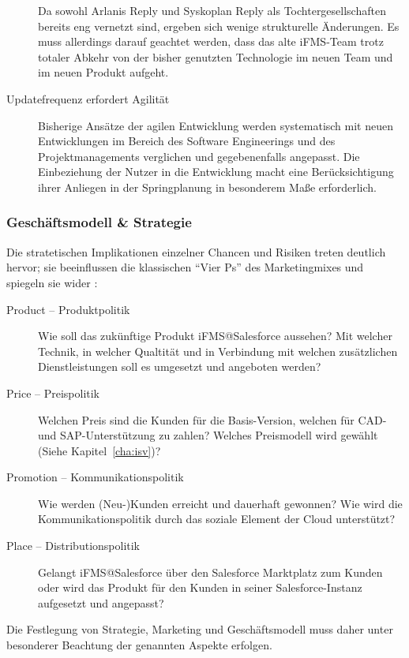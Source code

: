 \begin{description}
Da sowohl Arlanis Reply und Syskoplan Reply als Tochtergesellschaften bereits 
eng vernetzt sind, ergeben sich wenige strukturelle Änderungen. Es muss 
allerdings darauf geachtet werden, dass das alte iFMS-Team trotz totaler Abkehr 
von der bisher genutzten Technologie im neuen Team und im neuen Produkt 
aufgeht.
	\item[Updatefrequenz erfordert Agilität] Bisherige Ansätze der agilen 
Entwicklung werden systematisch mit neuen Entwicklungen im Bereich des Software 
Engineerings und des Projektmanagements verglichen und gegebenenfalls 
angepasst. Die Einbeziehung der Nutzer in die Entwicklung macht eine 
Berücksichtigung ihrer Anliegen in der Springplanung in besonderem Maße 
erforderlich.
\end{description}

\subsubsection{Geschäftsmodell \& Strategie}
Die stratetischen Implikationen einzelner Chancen und Risiken treten deutlich 
hervor; sie beeinflussen die klassischen "`Vier Ps"' des Marketingmixes und 
spiegeln sie wider :
\begin{description}
	\item[Product -- Produktpolitik] Wie soll das 
zukünftige Produkt iFMS@Salesforce aussehen? Mit welcher Technik, in welcher 
Qualtität und in Verbindung mit welchen zusätzlichen Dienstleistungen soll es 
umgesetzt und angeboten werden?
	\item[Price -- Preispolitik] Welchen Preis sind die 
Kunden für die Basis-Version, welchen für CAD- und SAP-Unterstützung zu zahlen? 
Welches Preismodell wird gewählt (Siehe Kapitel~\ref{cha:isv})? 
	\item[Promotion -- Kommunikationspolitik] Wie werden (Neu-)Kunden 
erreicht und dauerhaft gewonnen? Wie wird die Kommunikationspolitik durch das 
soziale Element der Cloud unterstützt?
	\item[Place --  Distributionspolitik] Gelangt iFMS@Salesforce über den 
Salesforce Marktplatz zum Kunden oder wird das Produkt für den Kunden in seiner 
Salesforce-Instanz aufgesetzt und angepasst?
\end{description}
Die Festlegung von Strategie, Marketing und Geschäftsmodell muss daher unter 
besonderer Beachtung der genannten Aspekte erfolgen. 

